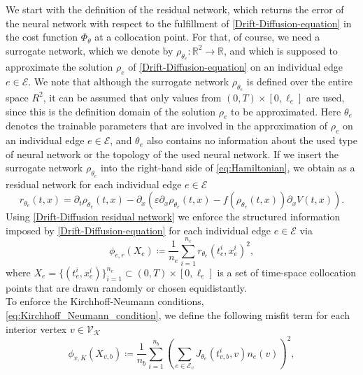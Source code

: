 We start with the definition of the residual network, which returns the error of the neural network with respect to the fulfillment of \cref{Drift-Diffusion-equation} in the cost function $\Phi_\theta$ at a collocation point. For that, of course, we need a surrogate network, which we denote by $\rho_{\theta_e} \colon \mathbb{R}^2 \to \mathbb{R}$, and which is supposed to approximate the solution $\rho_e$ of \cref{Drift-Diffusion-equation} on an individual edge $e \in \mathcal{E}$. We note that although the surrogate network $\rho_{\theta_e}$ is defined over the entire space $R^2$, it can be assumed that only values from $\left( 0, T \right) \times \left[0, \ell_e\right]$ are used, since this is the definition domain of the solution $\rho_e$ to be approximated. Here $\theta_e$ denotes the trainable parameters that are involved in the approximation of $\rho_e$ on an individual edge $e \in \mathcal{E}$, and $\theta_e$ also contains no information about the used type of neural network or the topology of the used neural network. If we insert the surrogate network $\rho_{\theta_e}$ into the right-hand side of \cref{eq:Hamiltonian}, we obtain as a residual network for each individual edge $e \in \mathcal{E}$
\begin{equation}
    \label{Drift-Diffusion residual network}
    r_{\theta_e} \left( t,x \right)=\partial_t \rho_{\theta_e} \left( t,x \right) - \partial_x   \left(  \varepsilon \partial_x  \rho_{\theta_e} \left( t,x \right) - f \left( \rho_{\theta_e} \left( t,x \right) \right) \partial_x V \left( t,x \right) \right).
\end{equation}
Using \cref{Drift-Diffusion residual network} we enforce the structured information imposed by \cref{Drift-Diffusion-equation} for each individual edge $e \in \mathcal{E}$ via
\begin{equation} 
    \label{misfit:residual}
    \phi_{e,r}  \left( X_e \right) \coloneqq \frac{1}{n_e} \sum_{i=1}^{n_e} r_{\theta_e}  \left( t_e^i, x_e^i  \right)^2,
\end{equation} 
where $X_e = \{ \left( t_e^i, x_e^i \right)\}_{i=1}^{n_e} \subset \left( 0, T \right) \times \left[0, \ell_e\right]$ is a set of time-space collocation points that are drawn randomly or chosen equidistantly. \\
To enforce the Kirchhoff-Neumann conditions, \cref{eq:Kirchhoff_Neumann_condition}, we define the following misfit term for each interior vertex $v \in \mathcal{V}_\mathcal{K}$ 
\begin{equation} 
    \label{misfit:Kirchhoff}
    \phi_{v,K}  \left( X_{v,b} \right) \coloneqq \frac{1}{n_b} \sum_{i=1}^{n_b}  \left( \sum_{e \in \mathcal{E}_v}  J_{\theta_e}\left( t_{v,b}^i, v \right)  n_e  \left( v \right) \right)^2, 
\end{equation} 
